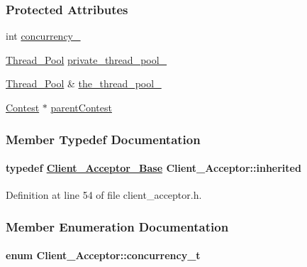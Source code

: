 \subsubsection*{Protected Attributes}
\begin{CompactItemize}
\item 
int \hyperlink{classClient__Acceptor_Client__Acceptorn0}{concurrency\_\-}
\item 
\hyperlink{classThread__Pool}{Thread\_\-Pool} \hyperlink{classClient__Acceptor_Client__Acceptorn1}{private\_\-thread\_\-pool\_\-}
\item 
\hyperlink{classThread__Pool}{Thread\_\-Pool} \& \hyperlink{classClient__Acceptor_Client__Acceptorn2}{the\_\-thread\_\-pool\_\-}
\item 
\hyperlink{classContest}{Contest} $\ast$ \hyperlink{classClient__Acceptor_Client__Acceptorn3}{parent\-Contest}
\end{CompactItemize}


\subsubsection{Member Typedef Documentation}
\hypertarget{classClient__Acceptor_Client__Acceptors0}{
\paragraph[inherited]{\setlength{\rightskip}{0pt plus 5cm}typedef \hyperlink{client__acceptor_8h_a0}{Client\_\-Acceptor\_\-Base} Client\_\-Acceptor::inherited}\hfill}
\label{classClient__Acceptor_Client__Acceptors0}




Definition at line 54 of file client\_\-acceptor.h.

\subsubsection{Member Enumeration Documentation}
\hypertarget{classClient__Acceptor_Client__Acceptors4}{
\paragraph[concurrency\_\-t]{\setlength{\rightskip}{0pt plus 5cm}enum Client\_\-Acceptor::concurrency\_\-t}\hfill}
\label{classClient__Acceptor_Client__Acceptors4}


